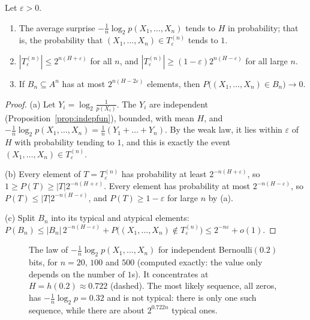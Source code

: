 \begin{theorem}\label{thm:aep}
Let $\varepsilon>0$.
\begin{enumerate}[label=(\alph*)]
\item The average surprise $-\frac1n\log_2p(X_1,\dots,X_n)$ tends to $H$ in probability; that is, the probability that
$(X_1,\dots,X_n)\in T_\varepsilon^{(n)}$ tends to $1$.
\item $|T_\varepsilon^{(n)}|\le2^{n(H+\varepsilon)}$ for all $n$, and $|T_\varepsilon^{(n)}|\ge(1-\varepsilon)2^{n(H-\varepsilon)}$ for all large $n$.
\item If $B_n\subseteq A^n$ has at most $2^{n(H-2\varepsilon)}$ elements, then $P\bigl((X_1,\dots,X_n)\in B_n\bigr)\to0$.
\end{enumerate}
\end{theorem}
\begin{proof}
(a) Let $Y_i=\log_2\frac1{p(X_i)}$. The $Y_i$ are independent (Proposition~\ref{prop:indepfun}), bounded, with mean $H$, and
$-\frac1n\log_2p(X_1,\dots,X_n)=\frac1n(Y_1+\dots+Y_n)$. By the weak law, it lies within $\varepsilon$ of $H$ with probability tending to $1$, and
this is exactly the event $(X_1,\dots,X_n)\in T_\varepsilon^{(n)}$.

(b) Every element of $T=T_\varepsilon^{(n)}$ has probability at least $2^{-n(H+\varepsilon)}$, so $1\ge P(T)\ge|T|2^{-n(H+\varepsilon)}$. Every element has
probability at most $2^{-n(H-\varepsilon)}$, so $P(T)\le|T|2^{-n(H-\varepsilon)}$, and $P(T)\ge1-\varepsilon$ for large $n$ by (a).

(c) Split $B_n$ into its typical and atypical elements:
$P(B_n)\le|B_n|\,2^{-n(H-\varepsilon)}+P\bigl((X_1,\dots,X_n)\notin T_\varepsilon^{(n)}\bigr)\le2^{-n\varepsilon}+o(1)$.
\end{proof}

\begin{figure}[ht]
\centering
{}
\caption{The law of $-\frac1n\log_2p(X_1,\dots,X_n)$ for independent Bernoulli$(0.2)$ bits, for $n=20$, $100$ and $500$ (computed exactly:
the value only depends on the number of $1$s). It concentrates at $H=h(0.2)\approx0.722$ (dashed). The most likely sequence, all
zeros, has $-\frac1n\log_2p=0.32$ and is not typical: there is only one such sequence, while there are about $2^{0.722n}$ typical ones.}
\label{fig:aep}
\end{figure}


